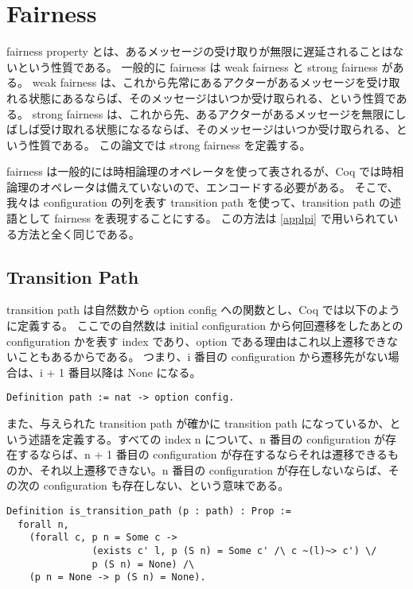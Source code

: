 \section{Fairness}

fairness property とは、あるメッセージの受け取りが無限に遅延されることはないという性質である。
一般的に fairness は weak fairness と strong fairness がある。
weak fairness は、これから先常にあるアクターがあるメッセージを受け取れる状態にあるならば、そのメッセージはいつか受け取られる、という性質である。
strong fairness は、これから先、あるアクターがあるメッセージを無限にしばしば受け取れる状態になるならば、そのメッセージはいつか受け取られる、という性質である。
この論文では strong fairness を定義する。

fairness は一般的には時相論理のオペレータを使って表されるが、Coq では時相論理のオペレータは備えていないので、エンコードする必要がある。
そこで、我々は configuration の列を表す transition path を使って、transition path の述語として fairness を表現することにする。
この方法は \ref{applpi} で用いられている方法と全く同じである。

\subsection{Transition Path}
transition path は自然数から option config への関数とし、Coq では以下のように定義する。
ここでの自然数は initial configuration から何回遷移をしたあとの configuration かを表す index であり、option である理由はこれ以上遷移できないこともあるからである。
つまり、i 番目の configuration から遷移先がない場合は、i + 1 番目以降は None になる。

\begin{lstlisting}
Definition path := nat -> option config.
\end{lstlisting}

また、与えられた transition path が確かに transition path になっているか、という述語を定義する。すべての index n について、n 番目の configuration が存在するならば、n + 1 番目の configuration が存在するならそれは遷移できるものか、それ以上遷移できない。n 番目の configuration が存在しないならば、その次の configuration も存在しない、という意味である。

\begin{lstlisting}
Definition is_transition_path (p : path) : Prop :=
  forall n,
    (forall c, p n = Some c ->
               (exists c' l, p (S n) = Some c' /\ c ~(l)~> c') \/
               p (S n) = None) /\
    (p n = None -> p (S n) = None).
\end{lstlisting}

